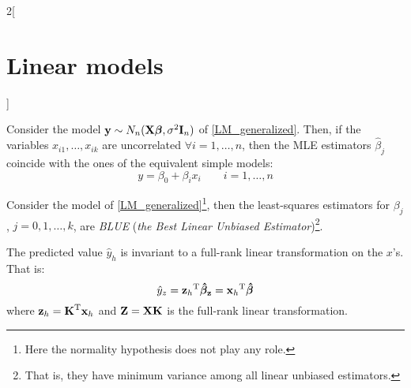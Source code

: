 \documentclass[../../../main_math.tex]{subfiles}
\begin{document}
\begin{multicols}{2}[\section{Linear models}]
\begin{proposition}
    Consider the model $\boldsymbol{\mathrm{y}}\sim N_n(\boldsymbol{\mathrm{X\beta}},\sigma^2\boldsymbol{\mathrm{I}}_n)$ of \cref{LM_generalized}. Then, if the variables $x_{i1},\ldots,x_{ik}$ are uncorrelated $\forall i=1,\ldots,n$, then the MLE estimators $\hat\beta_j$ coincide with the ones of the equivalent simple models: $$y=\beta_0+\beta_i x_i\qquad i=1,\ldots,n$$
  \end{proposition}
  \begin{theorem}
    Consider the model of \cref{LM_generalized}\footnote{Here the normality hypothesis does not play any role.}, then the least-squares estimators for $\beta_j$, $j=0,1,\ldots,k$, are \emph{BLUE} (\emph{the Best Linear Unbiased Estimator})\footnote{That is, they have minimum variance among all linear unbiased estimators.}.
  \end{theorem}
  \begin{corollary}
    The predicted value $\hat{y}_h$ is invariant to a full-rank linear transformation on the $x$'s. That is: $$\hat{y}_z={\boldsymbol{\mathrm{z}}_h}^{\mathrm{T}}\boldsymbol{\mathrm{\hat{\beta}_z}}={\boldsymbol{\mathrm{x}}_h}^{\mathrm{T}}\boldsymbol{\mathrm{\hat{\beta}}}$$ where $\boldsymbol{\mathrm{z}}_h={\boldsymbol{\mathrm{K}}}^{\mathrm{T}}\boldsymbol{\mathrm{x}}_h$ and $\boldsymbol{\mathrm{Z}}=\boldsymbol{\mathrm{XK}}$ is the full-rank linear transformation.
  \end{corollary}

\end{multicols}
\end{document}
